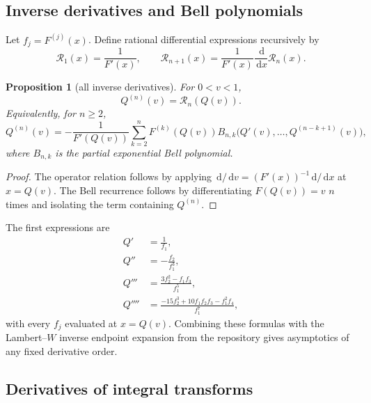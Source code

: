 \documentclass[11pt,oneside]{article}
\newtheorem{proposition}[theorem]{Proposition}
\theoremstyle{definition}
\newcommand{\F}{F}
\newcommand{\Q}{Q}
\newcommand{\dd}{\,\mathrm d}
\begin{document}
\subsection{Inverse derivatives and Bell polynomials}

Let \(f_j=\F^{(j)}(x)\).  Define rational differential expressions recursively by
\begin{equation}\label{eq:Rinverse-rec}
 \mathcal R_1(x)=\frac1{\F'(x)},
 \qquad
 \mathcal R_{n+1}(x)=\frac1{\F'(x)}\frac{\dd}{\dd x}\mathcal R_n(x).
\end{equation}

\begin{proposition}[all inverse derivatives]\label{prop:inverse-derivatives}
For \(0<v<1\),
\begin{equation}\label{eq:Q-nth-operator}
 \Q^{(n)}(v)=\mathcal R_n(\Q(v)).
\end{equation}
Equivalently, for \(n\ge2\),
\begin{equation}\label{eq:Q-Bell-rec}
 \Q^{(n)}(v)
 =-\frac1{\F'(\Q(v))}
 \sum_{k=2}^n\F^{(k)}(\Q(v))
 B_{n,k}\bigl(\Q'(v),\ldots,\Q^{(n-k+1)}(v)\bigr),
\end{equation}
where \(B_{n,k}\) is the partial exponential Bell polynomial.
\end{proposition}

\begin{proof}
The operator relation follows by applying \(\dd/\dd v=(\F'(x))^{-1}\dd/\dd x\) at
\(x=\Q(v)\).  The Bell recurrence follows by differentiating
\(\F(\Q(v))=v\) \(n\) times and isolating the term containing \(\Q^{(n)}\).
\end{proof}

The first expressions are
\begin{align}
 \Q'&=\frac1{f_1},\nonumber\\
 \Q''&=-\frac{f_2}{f_1^3},\nonumber\\
 \Q'''&=\frac{3f_2^2-f_1f_3}{f_1^5},\nonumber\\
 \Q''''&=\frac{-15f_2^3+10f_1f_2f_3-f_1^2f_4}{f_1^7},
 \label{eq:Q-first-derivatives}
\end{align}
with every \(f_j\) evaluated at \(x=\Q(v)\).  Combining these formulas with the
Lambert--\(W\) inverse endpoint expansion from the repository gives asymptotics of any
fixed derivative order.

\subsection{Derivatives of integral transforms}
\end{document}
